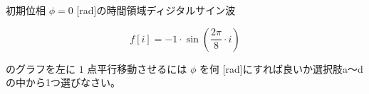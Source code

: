初期位相 $\phi = 0$ [rad]の時間領域ディジタルサイン波 

\[
f[i] = -1 \cdot \sin \left ( \frac{2 \pi}{8}  \cdot i \right )
\]

\noindent のグラフを左に $1$ 点平行移動させるには $\phi$ を何 [rad]にすれば良いか選択肢a〜dの中から1つ選びなさい。

